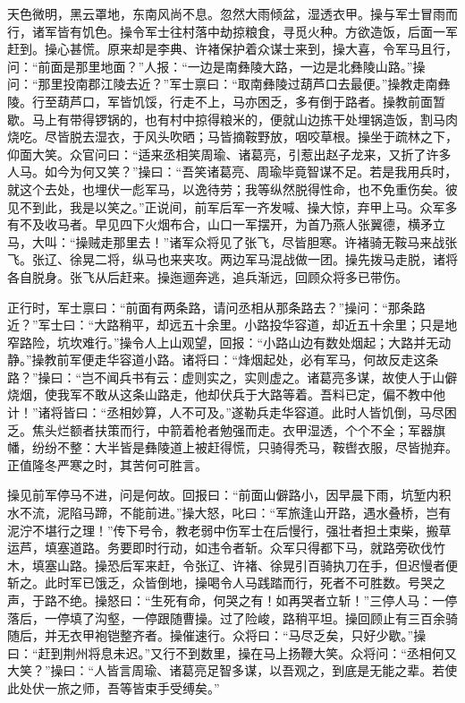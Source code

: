 天色微明，黑云罩地，东南风尚不息。忽然大雨倾盆，湿透衣甲。操与军士冒雨而行，诸军皆有饥色。操令军士往村落中劫掠粮食，寻觅火种。方欲造饭，后面一军赶到。操心甚慌。原来却是李典、许褚保护着众谋士来到，操大喜，令军马且行，问：“前面是那里地面？”人报：“一边是南彝陵大路，一边是北彝陵山路。”操问：“那里投南郡江陵去近？”军士禀曰：“取南彝陵过葫芦口去最便。”操教走南彝陵。行至葫芦口，军皆饥馁，行走不上，马亦困乏，多有倒于路者。操教前面暂歇。马上有带得锣锅的，也有村中掠得粮米的，便就山边拣干处埋锅造饭，割马肉烧吃。尽皆脱去湿衣，于风头吹晒；马皆摘鞍野放，咽咬草根。操坐于疏林之下，仰面大笑。众官问曰：“适来丞相笑周瑜、诸葛亮，引惹出赵子龙来，又折了许多人马。如今为何又笑？”操曰：“吾笑诸葛亮、周瑜毕竟智谋不足。若是我用兵时，就这个去处，也埋伏一彪军马，以逸待劳；我等纵然脱得性命，也不免重伤矣。彼见不到此，我是以笑之。”正说间，前军后军一齐发喊、操大惊，弃甲上马。众军多有不及收马者。早见四下火烟布合，山口一军摆开，为首乃燕人张翼德，横矛立马，大叫：“操贼走那里去！”诸军众将见了张飞，尽皆胆寒。许褚骑无鞍马来战张飞。张辽、徐晃二将，纵马也来夹攻。两边军马混战做一团。操先拨马走脱，诸将各自脱身。张飞从后赶来。操迤逦奔逃，追兵渐远，回顾众将多已带伤。

正行时，军士禀曰：“前面有两条路，请问丞相从那条路去？”操问：“那条路近？”军士曰：“大路稍平，却远五十余里。小路投华容道，却近五十余里；只是地窄路险，坑坎难行。”操令人上山观望，回报：“小路山边有数处烟起；大路并无动静。”操教前军便走华容道小路。诸将曰：“烽烟起处，必有军马，何故反走这条路？”操曰：“岂不闻兵书有云：虚则实之，实则虚之。诸葛亮多谋，故使人于山僻烧烟，使我军不敢从这条山路走，他却伏兵于大路等着。吾料已定，偏不教中他计！”诸将皆曰：“丞相妙算，人不可及。”遂勒兵走华容道。此时人皆饥倒，马尽困乏。焦头烂额者扶策而行，中箭着枪者勉强而走。衣甲湿透，个个不全；军器旗幡，纷纷不整：大半皆是彝陵道上被赶得慌，只骑得秃马，鞍辔衣服，尽皆抛弃。正值隆冬严寒之时，其苦何可胜言。

操见前军停马不进，问是何故。回报曰：“前面山僻路小，因早晨下雨，坑堑内积水不流，泥陷马蹄，不能前进。”操大怒，叱曰：“军旅逢山开路，遇水叠桥，岂有泥泞不堪行之理！”传下号令，教老弱中伤军士在后慢行，强壮者担土束柴，搬草运芦，填塞道路。务要即时行动，如违令者斩。众军只得都下马，就路旁砍伐竹木，填塞山路。操恐后军来赶，令张辽、许褚、徐晃引百骑执刀在手，但迟慢者便斩之。此时军已饿乏，众皆倒地，操喝令人马践踏而行，死者不可胜数。号哭之声，于路不绝。操怒曰：“生死有命，何哭之有！如再哭者立斩！”三停人马：一停落后，一停填了沟壑，一停跟随曹操。过了险峻，路稍平坦。操回顾止有三百余骑随后，并无衣甲袍铠整齐者。操催速行。众将曰：“马尽乏矣，只好少歇。”操曰：“赶到荆州将息未迟。”又行不到数里，操在马上扬鞭大笑。众将问：“丞相何又大笑？”操曰：“人皆言周瑜、诸葛亮足智多谋，以吾观之，到底是无能之辈。若使此处伏一旅之师，吾等皆束手受缚矣。”

